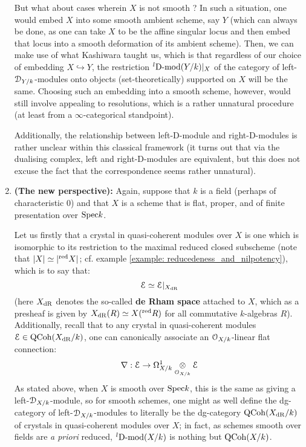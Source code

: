 \begin{enumerate}
                But what about cases wherein $X$ is not smooth ? In such a situation, one would embed $X$ into some smooth ambient scheme, say $Y$ (which can always be done, as one can take $X$ to be the affine singular locus and then embed that locus into a smooth deformation of its ambient scheme). Then, we can make use of what Kashiwara taught us, which is that regardless of our choice of embedding $X \hookrightarrow Y$, the restriction ${}^l\mathrm{D}\text{-}\mathrm{mod}(Y/k)|_X$ of the category of left-$\mathcal{D}_{Y/k}$-modules onto objects (set-theoretically) supported on $X$ will be the same. Choosing such an embedding into a smooth scheme, however, would still involve appealing to resolutions, which is a rather unnatural procedure (at least from a $\infty$-categorical standpoint).
                
                Additionally, the relationship between left-D-module and right-D-modules is rather unclear within this classical framework (it turns out that via the dualising complex, left and right-D-modules are equivalent, but this does not excuse the fact that the correspondence seems rather unnatural).
                \item \textbf{(The new perspective):} Again, suppose that $k$ is a field (perhaps of characteristic $0$) and that $X$ is a scheme that is flat, proper, and of finite presentation over $\mathrm{Spec} k$.
                
                Let us firstly that a crystal in quasi-coherent modules over $X$ is one which is isomorphic to its restriction to the maximal reduced closed subscheme (note that $|X| \simeq |{}^{\mathrm{red}}X|$; cf. example \ref{example: reducedeness_and_nilpotency}), which is to say that:
                    $$\mathcal{E} \simeq \mathcal{E}|_{X_{\mathrm{dR}}}$$
                (here $X_{\mathrm{dR}}$ denotes the so-called \textbf{de Rham space} attached to $X$, which as a presheaf is given by $X_{\mathrm{dR}}(R) \simeq X({}^{\mathrm{red}}R)$ for all commutative $k$-algebras $R$). Additionally, recall that to any crystal in quasi-coherent modules $\mathcal{E} \in \mathrm{QCoh}(X_{\mathrm{dR}}/k)$, one can canonically associate an $\mathcal{O}_{X/k}$-linear flat connection:
                    $$\nabla: \E \to \Omega^1_{X/k} \tensor_{\calO_{X/k}} \E$$
                As stated above, when $X$ is smooth over $\mathrm{Spec} k$, this is the same as giving a left-$\mathcal{D}_{X/k}$-module, so for smooth schemes, one might as well define the dg-category of left-$\mathcal{D}_{X/k}$-modules to literally be the dg-category $\mathrm{QCoh}(X_{\mathrm{dR}}/k)$ of crystals in quasi-coherent modules over $X$; in fact, as schemes smooth over fields are \textit{a priori} reduced, ${}^l\mathrm{D}\text{-}\mathrm{mod}(X/k)$ is nothing but $\mathrm{QCoh}(X/k)$.
                

\end{enumerate}
